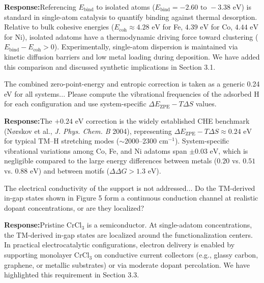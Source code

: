 \documentclass[11pt, sans, a4paper]{moderncv}
\newcommand{\response}{\vspace{0.4em}\noindent\textbf{\color{actionblue}Response:}\hspace{0.5em}}
\begin{document}
\response Referencing $E_{\mathrm{bind}}$ to isolated atoms ($E_{\mathrm{bind}} = -2.60\text{ to } -3.38\text{ eV}$) is standard in single-atom catalysis to quantify binding against thermal desorption. Relative to bulk cohesive energies ($E_{\mathrm{coh}} \approx 4.28\text{ eV}$ for Fe, $4.39\text{ eV}$ for Co, $4.44\text{ eV}$ for Ni), isolated adatoms have a thermodynamic driving force toward clustering ($E_{\mathrm{bind}} - E_{\mathrm{coh}} > 0$). Experimentally, single-atom dispersion is maintained via kinetic diffusion barriers and low metal loading during deposition. We have added this comparison and discussed synthetic implications in Section 3.1.

\begin{reviewercomment}
The combined zero-point-energy and entropic correction is taken as a generic 0.24 eV for all systems... Please compute the vibrational frequencies of the adsorbed H for each configuration and use system-specific $\Delta E_{\mathrm{ZPE}} - T\Delta S$ values.
\end{reviewercomment}

\response The $+0.24\text{ eV}$ correction is the widely established CHE benchmark (N{\o}rskov et al., \textit{J. Phys. Chem. B} 2004), representing $\Delta E_{\mathrm{ZPE}} - T\Delta S \approx 0.24\text{ eV}$ for typical $\text{TM--H}$ stretching modes ($\sim 2000\text{--}2300\text{ cm}^{-1}$). System-specific vibrational variations among Co, Fe, and Ni adatoms span $\pm 0.03\text{ eV}$, which is negligible compared to the large energy differences between metals ($0.20$ vs. $0.51$ vs. $0.88\text{ eV}$) and between motifs ($\Delta\Delta G > 1.3\text{ eV}$).

\begin{reviewercomment}
The electrical conductivity of the support is not addressed... Do the TM-derived in-gap states shown in Figure 5 form a continuous conduction channel at realistic dopant concentrations, or are they localized?
\end{reviewercomment}

\response Pristine $\text{CrCl}_3$ is a semiconductor. At single-adatom concentrations, the TM-derived in-gap states are localized around the functionalization centers. In practical electrocatalytic configurations, electron delivery is enabled by supporting monolayer $\text{CrCl}_3$ on conductive current collectors (e.g., glassy carbon, graphene, or metallic substrates) or via moderate dopant percolation. We have highlighted this requirement in Section 3.3.
\end{document}
